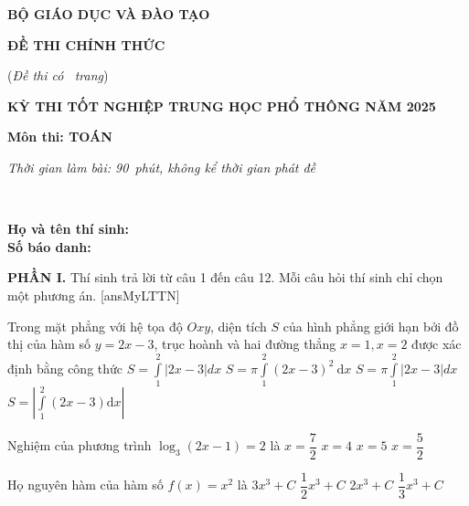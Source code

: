 \documentclass[12pt,a4paper]{article}
\begin{document}
\begin{minipage}[b]{4.5cm}
\centerline{\footnotesize\textbf{BỘ GIÁO DỤC VÀ ĐÀO TẠO}}
\centerline{\footnotesize\textbf{ĐỀ THI CHÍNH THỨC}}
\centerline{\footnotesize(\textit{Đề thi có \pageref{mylt}\ trang})}
\end{minipage}\hspace{1cm}
\begin{minipage}[b]{12cm}
\centerline{\footnotesize\textbf{KỲ THI TỐT NGHIỆP TRUNG HỌC PHỔ THÔNG NĂM 2025}}
\centerline{\footnotesize\textbf{Môn thi: TOÁN}}
\centerline{\footnotesize\textit{Thời gian làm bài: 90\ phút, không kể thời gian phát đề}}
\end{minipage}\\
\begin{minipage}[b]{10cm}
\vspace{6pt}\textbf{Họ và tên thí sinh: }{\tiny\dotfill}\\
\textbf{Số báo danh: }{\tiny\dotfill}
\end{minipage}\hfill
\begin{minipage}[b]{7.5cm}
\flushright{}
\end{minipage}\hfill
\noindent\textbf{PHẦN I.} Thí sinh trả lời từ câu 1 đến câu 12. Mỗi câu hỏi thí sinh chỉ chọn một phương án.
[ansMyLTTN]
\begin{ex}%
Trong mặt phẳng với hệ tọa độ $O x y$, diện tích $S$ của hình phẳng giới hạn bởi đồ thị của hàm số $y=2x-3$, trục hoành và hai đường thẳng $x=1, x=2$ được xác định bằng công thức
\choice
{$S=\displaystyle\int\limits_1^2|2 x-3| d x$}
{$S=\pi \displaystyle\int\limits_1^2(2 x-3)^2 \mathrm{~d}x$}
{$S=\pi \displaystyle\int\limits_1^2|2 x-3| d x$}
{$S=\left|\displaystyle\int\limits_1^2(2 x-3) \mathrm{d}x\right|$}
\end{ex}

\begin{ex}%
Nghiệm của phương trình $\log_3(2x-1)=2$ là
\choice
{$x=\dfrac{7}{2}$}
{$x=4$}
{$x=5$}
{$x=\dfrac{5}{2}$}
\end{ex}

\begin{ex}%
Họ nguyên hàm của hàm số $f(x)=x^2$ là
\choice
{$3x^3+C$}
{$\dfrac{1}{2}x^3+C$}
{$2x^3+C$}
{$\dfrac{1}{3}x^3+C$}
\end{ex}
\end{document}
